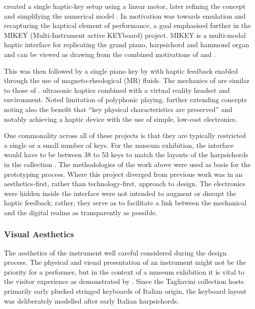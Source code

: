 \textcite{gillespie_dynamical_1992} created a single haptic-key setup using a linear motor, later refining the concept and simplifying the numerical model \cite{gillespie_virtual_1994}. 
In \textcite{gillespie_virtual_1994} motivation was towards emulation and recapturing the haptical element of performance, a goal emphasised further in the MIKEY (Multi-Instrument active KEYboard) project. MIKEY is a multi-modal haptic interface for replicating the grand piano, harpsichord and hammond organ and can be viewed as drawing from the combined motivations of \textcite{cadoz_modular_1990} and \textcite{gillespie_virtual_1994}.

This was then followed by a single piano key by \textcite{lozada_novel_2007} with haptic feedback enabled through the use of magneto-rheological (MR) fluids. The mechanics of \textcite{lozada_novel_2007} are similar to those of \textcite{cadoz_modular_1990}. 
\textcite{hwang_airpiano_2017} ultrasonic haptics combined with a virtual reality headset and environment. Noted limitation of polyphonic playing.
\textcite{timmermans_multibody-based_2020} further extending concepts \textcite{oboe_mikey_2006}  noting also the benefit that ``key physical characteristics are preserved'' and notably achieving a haptic device with the use of simple, low-cost electronics.

One commonality across all of these projects is that they are typically restricted a single or a small number of keys. For the museum exhibition, the interface would have to be between 38 to 53 keys to match the layouts of the harpsichords in the collection \cite{tagliavini_clavicembali_1987}. The methodologies of the work above were used as basis for the prototyping process. Where this project  diverged from previous work was in an aesthetics-first, rather than technology-first, approach to design. The electronics were hidden inside the interface were not intended to augment or 
disrupt the haptic feedback; rather, they serve as to facilitate a link between the
mechanical and the digital realms as transparently as possible. 

\subsubsection{Visual Aesthetics}

The aesthetics of the instrument well careful considered during the design process.
The physical and visual presentation of an instrument might not be the priority for a performer, but in the context of a museum exhibition it is vital to the visitor experience as demonstrated by \textcite{mcalpine_sampling_2014}.
Since the Tagliavini collection hosts primarily early plucked stringed keyboards of Italian origin,
the keyboard layout was deliberately modelled after early Italian harpsichords.

